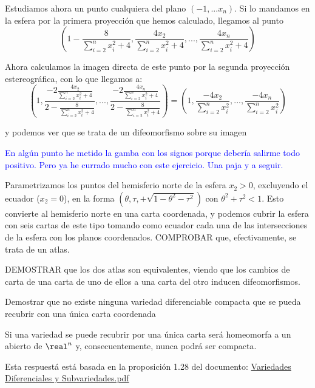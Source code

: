 \begin{problem}[2]
Estudiamos ahora un punto cualquiera del plano $(-1,...x_n)$. Si lo mandamos en la esfera por la primera proyección que hemos calculado, llegamos al punto
\[\left(1-\frac{8}{\sum_{i=2}^nx_i^2+4}, \frac{4x_2}{\sum_{i=2}^nx_i^2+4},...,\frac{4x_n}{\sum_{i=2}^nx_i^2+4} \right)\]

Ahora calculamos la imagen directa de este punto por la segunda proyección estereográfica, con lo que llegamos a:
\[\left( 1, \frac{-2\frac{4x_2}{\sum_{i=2}^nx_i^2+4}}{2-\frac{8}{\sum_{i=2}^nx_i^2+4}}, ..., \frac{-2\frac{4x_n}{\sum_{i=2}^nx_i^2+4}}{2-\frac{8}{\sum_{i=2}^nx_i^2+4}}\right)=\left( 1, \frac{-4x_2}{\sum_{i=2}^nx_i^2},...,\frac{-4x_n}{\sum_{i=2}^nx_i^2}\right)\]

y podemos ver que se trata de un difeomorfismo sobre su imagen

\textcolor{blue}{En algún punto he metido la gamba con los signos porque debería salirme todo positivo. Pero ya he currado mucho con este ejercicio. Una paja y a seguir.}

\end{problem}



\begin{problem}[3]
Parametrizamos los puntos del hemisferio norte de la esfera $x_2 > 0$,
excluyendo el ecuador ($x_2 = 0$), en la forma $(θ, τ, + \sqrt{1 − θ^2 − τ^2})$ con
$θ^2 + τ^2 < 1$. Esto convierte al hemisferio norte en una carta coordenada, y podemos cubrir la esfera con seis cartas de este tipo tomando
como ecuador cada una de las intersecciones de la esfera con los planos
coordenados. COMPROBAR que, efectivamente, se trata de un atlas.

DEMOSTRAR que los dos atlas son equivalentes, viendo que los cambios
de carta de una carta de uno de ellos a una carta del otro inducen difeomorfismos.

\solution
\end{problem}

\begin{problem}[4]
Demostrar que no existe ninguna variedad diferenciable compacta que se pueda recubrir con una única carta coordenada
\solution


Si una variedad se puede recubrir por una única carta será homeomorfa a un abierto de $\real^n$ y, consecuentemente, nunca podrá ser compacta.

Esta respuestá está basada en la proposición 1.28 del documento: \href{http://ocw.um.es/ciencias/geometria-y-topologia/material-de-clase-1/01-variedadesdiferenciablessubvariedades-v100901.pdf}{Variedades Diferenciales y Subvariedades.pdf}
\end{problem}

